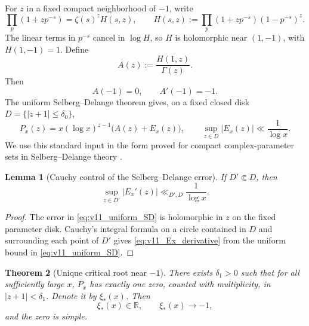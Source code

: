 \documentclass[11pt]{amsart}
\numberwithin{equation}{section}
\theoremstyle{plain}
\newtheorem{theorem}{Theorem}[section]
\newtheorem{lemma}[theorem]{Lemma}
\theoremstyle{definition}
\theoremstyle{remark}
\begin{document}
For \(z\) in a fixed compact neighborhood of \(-1\), write
\begin{equation}
\prod_p(1+zp^{-s})
=\zeta(s)^z H(s,z),
\qquad
H(s,z):=\prod_p(1+zp^{-s})(1-p^{-s})^z.
\label{eq:v11_SD_factorization}
\end{equation}
The linear terms in \(p^{-s}\) cancel in \(\log H\), so \(H\) is holomorphic
near \((1,-1)\), with \(H(1,-1)=1\).  Define
\begin{equation}
A(z):=\frac{H(1,z)}{\Gamma(z)}.
\label{eq:v11_Az}
\end{equation}
Then
\begin{equation}
A(-1)=0,
\qquad
A'(-1)=-1.
\label{eq:v11_A_simple_zero}
\end{equation}
The uniform Selberg--Delange theorem gives, on a fixed closed disk
\(D=\{|z+1|\le\delta_0\}\),
\begin{equation}
P_x(z)
=x(\log x)^{z-1}\bigl(A(z)+E_x(z)\bigr),
\qquad
\sup_{z\in D}|E_x(z)|\ll\frac1{\log x}.
\label{eq:v11_uniform_SD}
\end{equation}
We use this standard input in the form proved for compact complex-parameter
sets in Selberg--Delange theory
\cite{Tenenbaum2015,deLaBretecheTenenbaum2021}.

\begin{lemma}[Cauchy control of the Selberg--Delange error]
\label{lem:v11_Ex_derivative}
If \(D'\Subset D\), then
\begin{equation}
\sup_{z\in D'}|E_x'(z)|\ll_{D',D}\frac1{\log x}.
\label{eq:v11_Ex_derivative}
\end{equation}
\end{lemma}

\begin{proof}
The error in \eqref{eq:v11_uniform_SD} is holomorphic in \(z\) on the fixed
parameter disk.  Cauchy's integral formula on a circle contained in \(D\)
and surrounding each point of \(D'\) gives
\eqref{eq:v11_Ex_derivative} from the uniform bound in
\eqref{eq:v11_uniform_SD}.
\end{proof}

\begin{theorem}[Unique critical root near \(-1\)]
\label{thm:v11_unique_critical_root}
There exists \(\delta_1>0\) such that for all sufficiently large \(x\),
\(P_x\) has exactly one zero, counted with multiplicity, in
\(|z+1|<\delta_1\).  Denote it by \(\xi_*(x)\).  Then
\begin{equation}
\xi_*(x)\in\mathbb R,
\qquad
\xi_*(x)\to-1,
\label{eq:v11_xistar_real}
\end{equation}
and the zero is simple.
\end{theorem}
\end{document}
